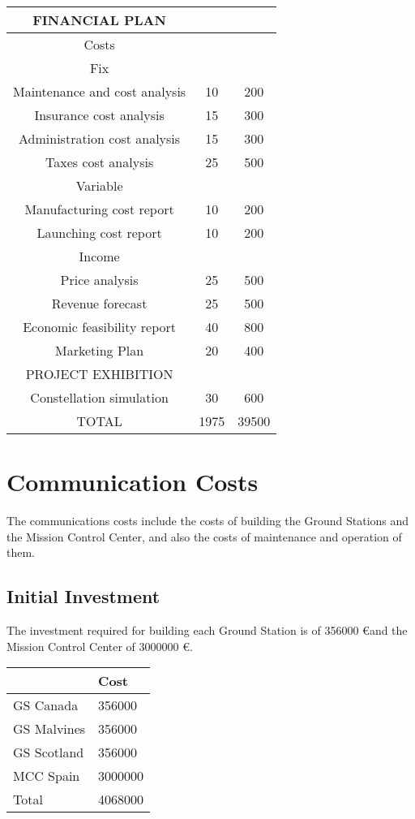 \begin{longtable}{ccc}
	FINANCIAL PLAN &  &  \\ \hline
	Costs &  &  \\ \hline
	Fix &  &  \\ \hline
	Maintenance and cost analysis & 10 & 200 \\ \hline
	Insurance cost analysis & 15 & 300 \\ \hline
	Administration cost analysis & 15 & 300 \\ \hline
	Taxes cost analysis & 25 & 500 \\ \hline
	Variable &  &  \\ \hline
	Manufacturing cost report & 10 & 200 \\ \hline
	Launching cost report & 10 & 200 \\ \hline
	Income &  &  \\ \hline
	Price analysis & 25 & 500 \\ \hline
	Revenue forecast & 25 & 500 \\ \hline
	Economic feasibility report & 40 & 800 \\ \hline
	Marketing Plan & 20 & 400 \\ \hline
	\rowcolor[gray]{0.85}
	PROJECT EXHIBITION &  &  \\ \hline
	Constellation simulation & 30 & 600 \\ \hline
	\rowcolor[gray]{0.65}
	TOTAL & 1975 & 39500 \\
	\bottomrule
\end{longtable}

\section{Communication Costs}
The communications costs include the costs of building the Ground Stations and the Mission Control Center, and also the costs of maintenance and operation of them.
\subsection{Initial Investment}
The investment required for building each Ground Station is of 356000 \euro and the Mission Control Center of 3000000 \euro. 

\begin{center}
\begin{tabular}{ | l | l | }
\toprule
\hline
\rowcolor[gray]{0.75}
	 & Cost \\ \hline
	GS Canada & 356000 \\ \hline
	GS Malvines & 356000 \\ \hline
	GS Scotland & 356000 \\ \hline
	MCC Spain & 3000000 \\ \hline
	\rowcolor[gray]{0.65}
	Total & 4068000 \\ \hline
\bottomrule

\end{tabular}
\end{center}



